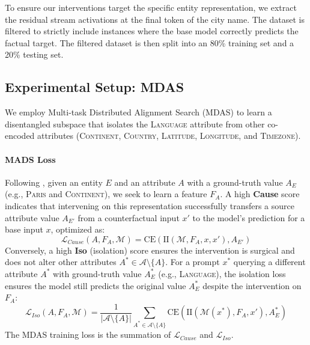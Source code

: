 To ensure our interventions target the specific entity representation, we extract the residual stream activations at the final token of the city name. The dataset is filtered to strictly include instances where the base model correctly predicts the factual target. The filtered dataset is then split into an 80\% training set and a 20\% testing set.

\subsection{Experimental Setup: MDAS}
We employ Multi-task Distributed Alignment Search (MDAS) to learn a disentangled subspace that isolates the \textsc{Language} attribute from other co-encoded attributes (\textsc{Continent}, \textsc{Country}, \textsc{Latitude}, \textsc{Longitude}, and \textsc{Timezone}). 

\paragraph{MADS Loss}  Following \cite{huang2024ravel}, given an entity $E$ and an attribute $A$ with a ground-truth value $A_E$ (e.g., \textsc{Paris} and \textsc{Continent}), we seek to learn a feature $F_A$. A high \textbf{Cause} score indicates that intervening on this representation successfully transfers a source attribute value $A_{E'}$ from a counterfactual input $x'$ to the model's prediction for a base input $x$, optimized as:
\begin{equation}\label{eq:loss_cause}
\mathcal{L}_{Cause}(A, F_A, \mathcal{M}) = \text{CE}(\text{II}(\mathcal{M}, F_A, x, x'), A_{E'})
\end{equation}
Conversely, a high \textbf{Iso} (isolation) score ensures the intervention is surgical and does not alter other attributes $A^* \in \mathcal{A} \setminus \{A\}$. For a prompt $x^*$ querying a different attribute $A^*$ with ground-truth value $A_E^*$ (e.g., \textsc{Language}), the isolation loss ensures the model still predicts the original value $A_E^*$ despite the intervention on $F_A$:
\begin{equation}\label{eq:loss_iso}
\mathcal{L}_{Iso}(A, F_A, \mathcal{M}) = \frac{1}{|\mathcal{A} \setminus \{A\}|} \sum_{A^* \in \mathcal{A} \setminus \{A\}} \text{CE}(\text{II}(\mathcal{M}(x^*), F_A, x'), A_E^*)
\end{equation}
The MDAS training  loss is the summation of $\mathcal{L}_{Cause}$ and $\mathcal{L}_{Iso}$.  

